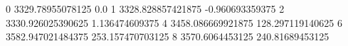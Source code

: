 0 3329.78955078125 0.0
1 3328.828857421875 -0.960693359375
2 3330.926025390625 1.136474609375
4 3458.086669921875 128.297119140625
6 3582.947021484375 253.157470703125
8 3570.6064453125 240.81689453125
